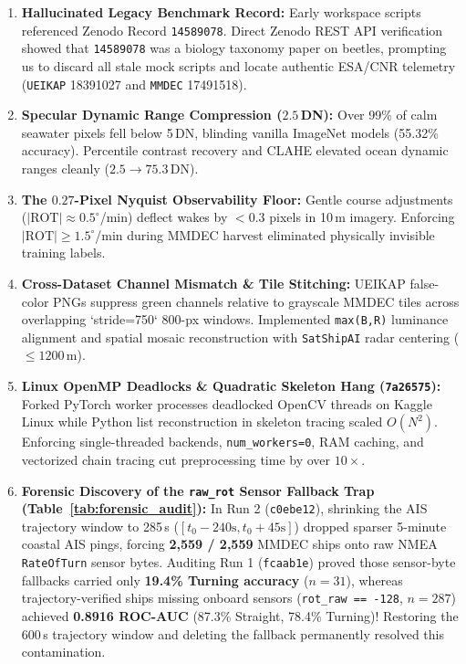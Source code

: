 \documentclass[11pt,a4paper]{article}
\begin{document}
\begin{enumerate}[leftmargin=1.5em]
    \item \textbf{Hallucinated Legacy Benchmark Record:} Early workspace scripts referenced Zenodo Record \texttt{14589078}. Direct Zenodo REST API verification showed that \texttt{14589078} was a biology taxonomy paper on beetles, prompting us to discard all stale mock scripts and locate authentic ESA/CNR telemetry (\texttt{UEIKAP} 18391027 and \texttt{MMDEC} 17491518).
    \item \textbf{Specular Dynamic Range Compression ($2.5$\,DN):} Over 99\% of calm seawater pixels fell below 5\,DN, blinding vanilla ImageNet models (55.32\% accuracy). Percentile contrast recovery and CLAHE elevated ocean dynamic ranges cleanly ($2.5 \rightarrow 75.3$\,DN).
    \item \textbf{The $0.27$-Pixel Nyquist Observability Floor:} Gentle course adjustments ($|\text{ROT}|\approx 0.5^\circ$/min) deflect wakes by $<0.3$ pixels in 10\,m imagery. Enforcing $|\text{ROT}|\ge 1.5^\circ$/min during MMDEC harvest eliminated physically invisible training labels.
    \item \textbf{Cross-Dataset Channel Mismatch \& Tile Stitching:} UEIKAP false-color PNGs suppress green channels relative to grayscale MMDEC tiles across overlapping `stride=750` 800-px windows. Implemented \texttt{max(B,R)} luminance alignment and spatial mosaic reconstruction with \texttt{SatShipAI} radar centering ($\le 1200$\,m).
    \item \textbf{Linux OpenMP Deadlocks \& Quadratic Skeleton Hang (\texttt{7a26575}):} Forked PyTorch worker processes deadlocked OpenCV threads on Kaggle Linux while Python list reconstruction in skeleton tracing scaled $O(N^2)$. Enforcing single-threaded backends, \texttt{num\_workers=0}, RAM caching, and vectorized chain tracing cut preprocessing time by over $10\times$.
    \item \textbf{Forensic Discovery of the \texttt{raw\_rot} Sensor Fallback Trap (Table~\ref{tab:forensic_audit}):} In Run 2 (\texttt{c0ebe12}), shrinking the AIS trajectory window to 285\,s ($[t_0-240\text{s}, t_0+45\text{s}]$) dropped sparser 5-minute coastal AIS pings, forcing \textbf{2,559 / 2,559} MMDEC ships onto raw NMEA \texttt{RateOfTurn} sensor bytes. Auditing Run 1 (\texttt{fcaab1e}) proved those sensor-byte fallbacks carried only \textbf{19.4\% Turning accuracy} ($n=31$), whereas trajectory-verified ships missing onboard sensors (\texttt{rot\_raw == -128}, $n=287$) achieved \textbf{0.8916 ROC-AUC} (87.3\% Straight, 78.4\% Turning)! Restoring the 600\,s trajectory window and deleting the fallback permanently resolved this contamination.

\end{enumerate}
\end{document}
